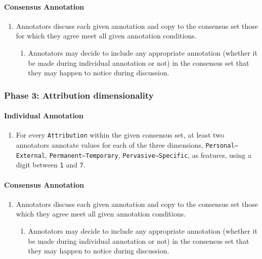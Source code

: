 \documentclass[a4paper,12pt]{article}
\begin{document}
    \paragraph{Consensus Annotation}
        \begin{enumerate}
            \item Annotators discuss each given annotation and copy to the consensus set those for which they agree meet all given annotation conditions.
                \begin{enumerate}
                    \item Annotators may decide to include any appropriate annotation (whether it be made during individual annotation or not) in the consensus set that they may happen to notice during discussion.
                \end{enumerate}
        \end{enumerate}

    \subsubsection{Phase 3: Attribution dimensionality}
    \paragraph{Individual Annotation}
    
        \begin{enumerate}
            \item For every \texttt{Attribution} within the given consensus set, at least two annotators annotate values for each of the three dimensions, \texttt{Personal--External}, \texttt{Permanent--Temporary}, \texttt{Pervasive--Specific}, as features, using a digit between \texttt{1} and \texttt{7}.
        \end{enumerate}
    \paragraph{Consensus Annotation}
        \begin{enumerate}
            \item Annotators discuss each given annotation and copy to the consensus set those which they agree meet all given annotation conditions.
                \begin{enumerate}
                    \item Annotators may decide to include any appropriate annotation (whether it be made during individual annotation or not) in the consensus set that they may happen to notice during discussion.
                \end{enumerate}
        \end{enumerate}
\end{document}
